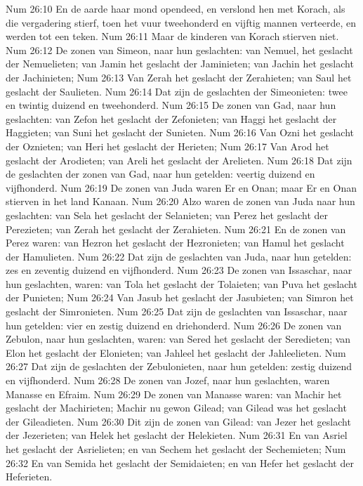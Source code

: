 Num 26:10  En de aarde haar mond opendeed, en verslond hen met Korach, als die vergadering stierf, toen het vuur tweehonderd en vijftig mannen verteerde, en werden tot een teken.
Num 26:11  Maar de kinderen van Korach stierven niet.
Num 26:12  De zonen van Simeon, naar hun geslachten: van Nemuel, het geslacht der Nemuelieten; van Jamin het geslacht der Jaminieten; van Jachin het geslacht der Jachinieten;
Num 26:13  Van Zerah het geslacht der Zerahieten; van Saul het geslacht der Saulieten.
Num 26:14  Dat zijn de geslachten der Simeonieten: twee en twintig duizend en tweehonderd.
Num 26:15  De zonen van Gad, naar hun geslachten: van Zefon het geslacht der Zefonieten; van Haggi het geslacht der Haggieten; van Suni het geslacht der Sunieten.
Num 26:16  Van Ozni het geslacht der Oznieten; van Heri het geslacht der Herieten;
Num 26:17  Van Arod het geslacht der Arodieten; van Areli het geslacht der Arelieten.
Num 26:18  Dat zijn de geslachten der zonen van Gad, naar hun getelden: veertig duizend en vijfhonderd.
Num 26:19  De zonen van Juda waren Er en Onan; maar Er en Onan stierven in het land Kanaan.
Num 26:20  Alzo waren de zonen van Juda naar hun geslachten: van Sela het geslacht der Selanieten; van Perez het geslacht der Perezieten; van Zerah het geslacht der Zerahieten.
Num 26:21  En de zonen van Perez waren: van Hezron het geslacht der Hezronieten; van Hamul het geslacht der Hamulieten.
Num 26:22  Dat zijn de geslachten van Juda, naar hun getelden: zes en zeventig duizend en vijfhonderd.
Num 26:23  De zonen van Issaschar, naar hun geslachten, waren: van Tola het geslacht der Tolaieten; van Puva het geslacht der Punieten;
Num 26:24  Van Jasub het geslacht der Jasubieten; van Simron het geslacht der Simronieten.
Num 26:25  Dat zijn de geslachten van Issaschar, naar hun getelden: vier en zestig duizend en driehonderd.
Num 26:26  De zonen van Zebulon, naar hun geslachten, waren: van Sered het geslacht der Seredieten; van Elon het geslacht der Elonieten; van Jahleel het geslacht der Jahleelieten.
Num 26:27  Dat zijn de geslachten der Zebulonieten, naar hun getelden: zestig duizend en vijfhonderd.
Num 26:28  De zonen van Jozef, naar hun geslachten, waren Manasse en Efraim.
Num 26:29  De zonen van Manasse waren: van Machir het geslacht der Machirieten; Machir nu gewon Gilead; van Gilead was het geslacht der Gileadieten.
Num 26:30  Dit zijn de zonen van Gilead: van Jezer het geslacht der Jezerieten; van Helek het geslacht der Helekieten.
Num 26:31  En van Asriel het geslacht der Asrielieten; en van Sechem het geslacht der Sechemieten;
Num 26:32  En van Semida het geslacht der Semidaieten; en van Hefer het geslacht der Heferieten.
